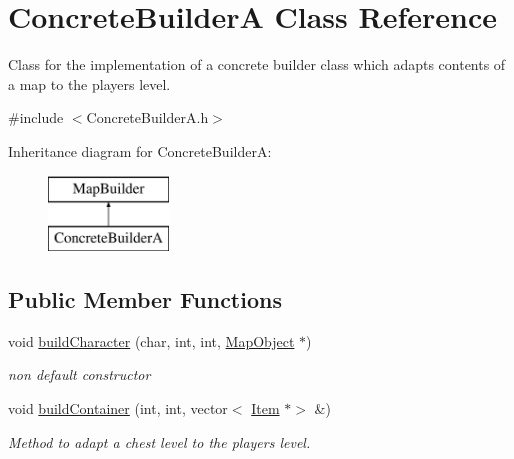 \hypertarget{class_concrete_builder_a}{}\section{Concrete\+BuilderA Class Reference}
\label{class_concrete_builder_a}


Class for the implementation of a concrete builder class which adapts contents of a map to the player\textquotesingle{}s level.  




{\ttfamily \#include $<$Concrete\+Builder\+A.\+h$>$}

Inheritance diagram for Concrete\+BuilderA\+:\begin{figure}[H]
\begin{center}
\leavevmode
\includegraphics[height=2.000000cm]{class_concrete_builder_a}
\end{center}
\end{figure}
\subsection*{Public Member Functions}
\begin{DoxyCompactItemize}
\item 
void \hyperlink{class_concrete_builder_a_ae442fa67468d68f65814f730e674af2d}{build\+Character} (char, int, int, \hyperlink{class_map_object}{Map\+Object} $\ast$)
\begin{DoxyCompactList}\small\item\em non default constructor \end{DoxyCompactList}\item 
\hypertarget{class_concrete_builder_a_a153a45d8b1b6369c7c4bc2a360e0c2a5}{}\label{class_concrete_builder_a_a153a45d8b1b6369c7c4bc2a360e0c2a5} 
void \hyperlink{class_concrete_builder_a_a153a45d8b1b6369c7c4bc2a360e0c2a5}{build\+Container} (int, int, vector$<$ \hyperlink{class_item}{Item} $\ast$$>$ \&)
\begin{DoxyCompactList}\small\item\em Method to adapt a chest level to the player\textquotesingle{}s level. \end{DoxyCompactList}\end{DoxyCompactItemize}

